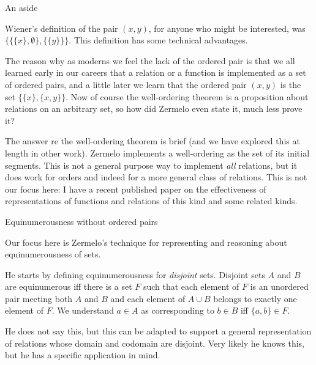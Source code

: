\documentclass{slides}
\begin{document}
\begin{slide}

{\Large An aside}

Wiener's definition of the pair $(x,y)$, for anyone who might be interested, was $\{\{\{x\},\emptyset\},\{\{y\}\}\}$.  This definition has some technical advantages.

\end{slide}

\begin{slide}

The reason why as moderns we feel the lack of the ordered pair is that we all learned early in our careers that a relation or a function is implemented as a set of ordered pairs, and a little later we learn that the ordered pair $(x,y)$ is the set $\{\{x\},\{x,y\}\}$.  Now of course the well-ordering theorem is a proposition about relations on an arbitrary set, so how did Zermelo even state it, much less prove it?

The answer re the well-ordering theorem is brief (and we have explored this at length in other work).  Zermelo implements a well-ordering as the set of its initial segments.  This is not a general purpose way to implement {\em all\/} relations, but it does work for orders and indeed for a more general class of relations.  This is not our focus here:  I have a recent published paper on the effectiveness of representations of functions and relations of this kind and some related kinds.

\end{slide}

\begin{slide}

{\Large Equinumerousness without ordered pairs}

Our focus here is Zermelo's technique for representing and reasoning about equinumerousness of sets.

He starts by defining equinumerousness for {\em disjoint\/} sets.  Disjoint sets $A$ and $B$ are equinumerous iff there is  a set $F$ such that each element of $F$ is an unordered pair meeting both $A$ and $B$ and each element of $A \cup B$ belongs to exactly one element of $F$.  We understand $a \in A$  as corresponding to $b \in B$ iff $\{a,b\} \in F$.

He does not say this, but this can be adapted to support a general representation of relations whose domain and codomain are disjoint.  Very likely he knows this, but he has a specific application in mind.


\end{slide}
\end{document}

